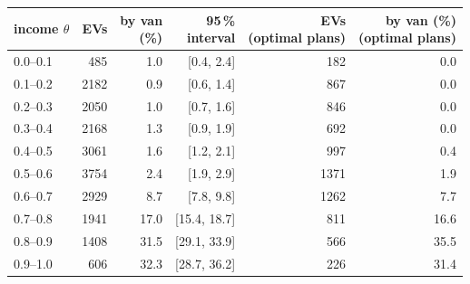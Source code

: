 \begin{tabular}{@{}lrrrrr@{}}
\toprule
income $\theta$ & EVs & \shortstack[r]{by van\\(\%)} & \shortstack[r]{95\,\%\\interval} & \shortstack[r]{EVs\\(optimal plans)} & \shortstack[r]{by van (\%)\\(optimal plans)} \\
\midrule
0.0--0.1 & 485 & 1.0 & [0.4, 2.4] & 182 & 0.0 \\
0.1--0.2 & 2182 & 0.9 & [0.6, 1.4] & 867 & 0.0 \\
0.2--0.3 & 2050 & 1.0 & [0.7, 1.6] & 846 & 0.0 \\
0.3--0.4 & 2168 & 1.3 & [0.9, 1.9] & 692 & 0.0 \\
0.4--0.5 & 3061 & 1.6 & [1.2, 2.1] & 997 & 0.4 \\
0.5--0.6 & 3754 & 2.4 & [1.9, 2.9] & 1371 & 1.9 \\
0.6--0.7 & 2929 & 8.7 & [7.8, 9.8] & 1262 & 7.7 \\
0.7--0.8 & 1941 & 17.0 & [15.4, 18.7] & 811 & 16.6 \\
0.8--0.9 & 1408 & 31.5 & [29.1, 33.9] & 566 & 35.5 \\
0.9--1.0 & 606 & 32.3 & [28.7, 36.2] & 226 & 31.4 \\
\bottomrule
\end{tabular}
